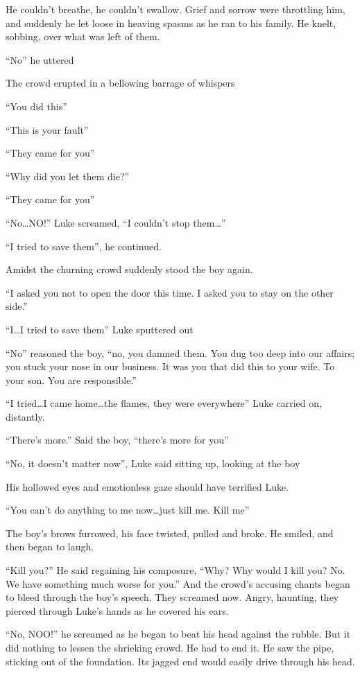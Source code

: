 He couldn't breathe, he couldn't swallow. Grief and
sorrow were throttling him, and suddenly he let loose in heaving
spasms as he ran to his family. He knelt, sobbing, over what was
left of them.

``No'' he uttered

The crowd erupted in a bellowing barrage of whispers

``You did this''

``This is your fault''

``They came for you''

``Why did you let them die?''

``They came for you''

``No{\ldots}NO!'' Luke screamed, ``I couldn't
stop them{\ldots}''

``I tried to save them'', he continued.

Amidst the churning crowd suddenly stood the boy again.

``I asked you not to open the door this time. I asked you to
stay on the other side.''

``I{\ldots}I tried to save them'' Luke sputtered
out

``No'' reasoned the boy, ``no, you damned them. You
dug too deep into our affairs; you stuck your nose in our business.
It was you that did this to your wife. To your son. You are
responsible.''

``I tried{\ldots}I came home{\ldots}the flames, they were
everywhere'' Luke carried on, distantly.

``There's more.'' Said the boy,
``there's more for you''

``No, it doesn't matter now'', Luke said sitting
up, looking at the boy

His hollowed eyes and emotionless gaze should have terrified
Luke.

``You can't do anything to me now{\ldots}just kill me.
Kill me''

The boy's brows furrowed, his face twisted, pulled and broke.
He smiled, and then began to laugh.

``Kill you?'' He said regaining his composure,
``Why? Why would I kill you? No. We have something much worse
for you.'' And the crowd's accusing chants began to
bleed through the boy's speech. They screamed now. Angry,
haunting, they pierced through Luke's hands as he covered his
ears.

``No, NOO!'' he screamed as he began to beat his head
against the rubble. But it did nothing to lessen the shrieking
crowd. He had to end it. He saw the pipe, sticking out of the
foundation. Its jagged end would easily drive through his
head.

